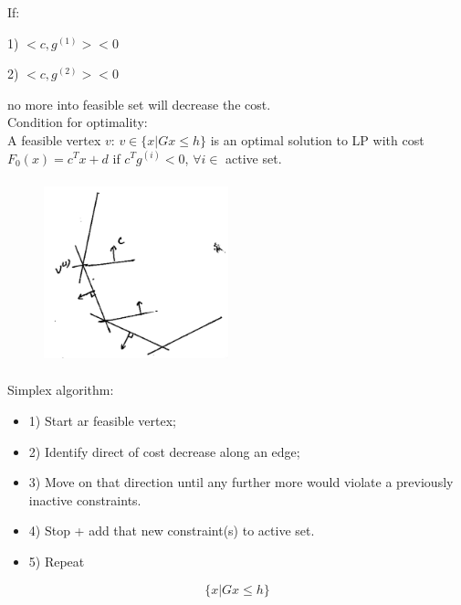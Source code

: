If:

1) $<c, g^{(1)}> < 0$

2) $<c, g^{(2)}> < 0$

no more into feasible set will decrease the cost.\\ 

Condition for optimality:\\

A feasible vertex $v$: $v\in\{x|Gx \leq h \}$ is an optimal solution to LP with cost $F_0(x) = c^Tx + d$ if $c^Tg^{(i)} < 0$, $\forall i\in$ active set.\\

\begin{figure}
	\centering
	\includegraphics[width=2.1in,height=2.1in]{figures/ch07/figure1012_9.png}
\end{figure}


Simplex algorithm:

\begin{itemize}
	\item 1) Start ar feasible vertex;
	
	\item 2) Identify direct of cost decrease along an edge;
	
	\item 3) Move on that direction until any further more would violate a previously inactive constraints.
	
	\item 4) Stop + add that new constraint(s) to active set.
	
	\item 5) Repeat
\end{itemize}







\begin{equation*}
\{x|Gx\leq h \}
\end{equation*}


